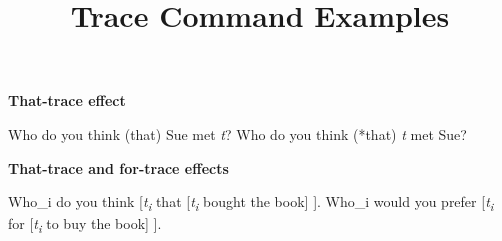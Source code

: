 \documentclass{article}
\newcommand*\tr[1][]{\textit{t\textsubscript{#1}}\xspace}
\begin{document}
\title{Trace Command Examples}
\maketitle

\begin{exe}
\ex \textbf{That-trace effect}
\begin{xlist}
\ex Who do you think (that) Sue met \tr?
\ex Who do you think (*that) \tr met Sue?
\end{xlist}
\end{exe}

\begin{exe}
\ex \textbf{That-trace and for-trace effects}
\begin{xlist}
\ex * Who_i do you think [\tr[i] that [\tr[i] bought the book] ].
\ex * Who_i would you prefer [\tr[i] for [\tr[i] to buy the book] ].
\end{xlist}
\end{exe}
\end{document}
